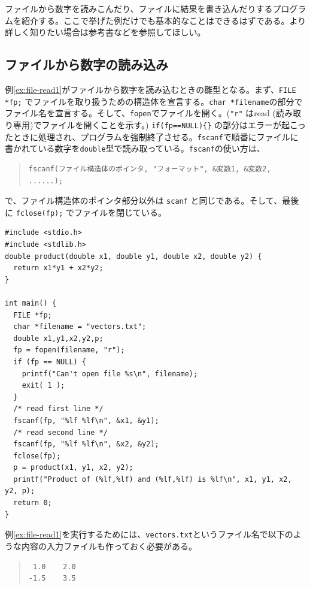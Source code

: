 ファイルから数字を読みこんだり、ファイルに結果を書き込んだりするプログラムを紹介する。ここで挙げた例だけでも基本的なことはできるはずである。より詳しく知りたい場合は参考書などを参照してほしい。

\subsection{ファイルから数字の読み込み}

例\ref{ex:file-read1}がファイルから数字を読み込むときの雛型となる。まず、\verb|FILE *fp;| でファイルを取り扱うための構造体を宣言する。\verb|char *filename|の部分でファイル名を宣言する。そして、\verb|fopen|でファイルを開く。(\verb|"r"| はread (読み取り専用)でファイルを開くことを示す。) \verb|if(fp==NULL){}| の部分はエラーが起こったときに処理され、プログラムを強制終了させる。\verb|fscanf|で順番にファイルに書かれている数字を\verb|double|型で読み取っている。\verb|fscanf|の使い方は、
\begin{quote}
\begin{verbatim}
fscanf(ファイル構造体のポインタ, "フォーマット", &変数1, &変数2, ......);
\end{verbatim}
\end{quote}
で、ファイル構造体のポインタ部分以外は \verb|scanf| と同じである。そして、最後に \verb|fclose(fp);| でファイルを閉じている。
\begin{reidai}\label{ex:file-read1}
\begin{verbatim}
#include <stdio.h>
#include <stdlib.h>
double product(double x1, double y1, double x2, double y2) {
  return x1*y1 + x2*y2;
}

int main() {
  FILE *fp;
  char *filename = "vectors.txt";
  double x1,y1,x2,y2,p;
  fp = fopen(filename, "r");
  if (fp == NULL) {
    printf("Can't open file %s\n", filename);
    exit( 1 );
  }
  /* read first line */
  fscanf(fp, "%lf %lf\n", &x1, &y1);
  /* read second line */
  fscanf(fp, "%lf %lf\n", &x2, &y2);
  fclose(fp);
  p = product(x1, y1, x2, y2);
  printf("Product of (%lf,%lf) and (%lf,%lf) is %lf\n", x1, y1, x2, y2, p);
  return 0;
}
\end{verbatim}
\end{reidai} \noindent
例\ref{ex:file-read1}を実行するためには、{\tt vectors.txt}というファイル名で以下のような内容の入力ファイルも作っておく必要がある。
\begin{quote}
\begin{verbatim}
 1.0    2.0
-1.5    3.5
\end{verbatim}
\end{quote}
